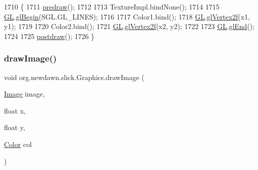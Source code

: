 \begin{DoxyCode}
1710                                                          \{
1711         \mbox{\hyperlink{classorg_1_1newdawn_1_1slick_1_1_graphics_a7b4c203181e3b6302d51ed9b24596b8d}{predraw}}();
1712 
1713         TextureImpl.bindNone();
1714 
1715         \mbox{\hyperlink{classorg_1_1newdawn_1_1slick_1_1_graphics_a39ca68db81b225982a4421c4a6835eed}{GL}}.\mbox{\hyperlink{interfaceorg_1_1newdawn_1_1slick_1_1opengl_1_1renderer_1_1_s_g_l_a34ef78aa5f8f5774c06117a01932fb02}{glBegin}}(SGL.GL\_LINES);
1716 
1717         Color1.bind();
1718         \mbox{\hyperlink{classorg_1_1newdawn_1_1slick_1_1_graphics_a39ca68db81b225982a4421c4a6835eed}{GL}}.\mbox{\hyperlink{interfaceorg_1_1newdawn_1_1slick_1_1opengl_1_1renderer_1_1_s_g_l_ad9c89f8bb275f22956f7687da5ec27c5}{glVertex2f}}(x1, y1);
1719 
1720         Color2.bind();
1721         \mbox{\hyperlink{classorg_1_1newdawn_1_1slick_1_1_graphics_a39ca68db81b225982a4421c4a6835eed}{GL}}.\mbox{\hyperlink{interfaceorg_1_1newdawn_1_1slick_1_1opengl_1_1renderer_1_1_s_g_l_ad9c89f8bb275f22956f7687da5ec27c5}{glVertex2f}}(x2, y2);
1722 
1723         \mbox{\hyperlink{classorg_1_1newdawn_1_1slick_1_1_graphics_a39ca68db81b225982a4421c4a6835eed}{GL}}.\mbox{\hyperlink{interfaceorg_1_1newdawn_1_1slick_1_1opengl_1_1renderer_1_1_s_g_l_a7f5666aaa59b12617ab81e1263140f72}{glEnd}}();
1724 
1725         \mbox{\hyperlink{classorg_1_1newdawn_1_1slick_1_1_graphics_abe054371d1486618ff327bbbcf02ff97}{postdraw}}();
1726     \}
\end{DoxyCode}
\mbox{\label{classorg_1_1newdawn_1_1slick_1_1_graphics_a2683a74a9890eb1a58999d397c19a0f0}} 
\subsubsection{\texorpdfstring{draw\+Image()}{drawImage()}\hspace{0.1cm}{\footnotesize\ttfamily [1/6]}}
{\footnotesize\ttfamily void org.\+newdawn.\+slick.\+Graphics.\+draw\+Image (\begin{DoxyParamCaption}\item[{\mbox{\hyperlink{classorg_1_1newdawn_1_1slick_1_1_image}{Image}}}]{image,  }\item[{float}]{x,  }\item[{float}]{y,  }\item[{\mbox{\hyperlink{classorg_1_1newdawn_1_1slick_1_1_color}{Color}}}]{col }\end{DoxyParamCaption})\hspace{0.3cm}{\ttfamily [inline]}}


